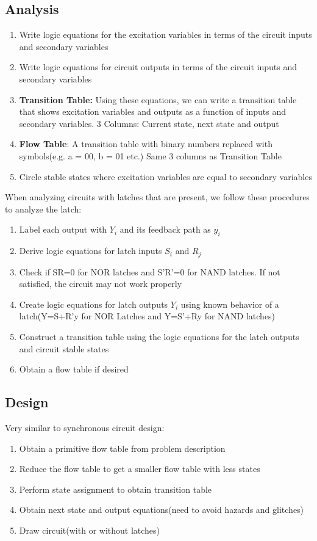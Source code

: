 \documentclass[12pt]{report}
\begin{document}
		\subsection{Analysis}
			\begin{enumerate}
				\item Write logic equations for the excitation variables in terms of the circuit inputs and secondary variables
				\item Write logic equations for circuit outputs in terms of the circuit inputs and secondary variables
				\item \textbf{Transition Table:} Using these equations, we can write a transition table that shows excitation variables and outputs as a function of inputs and secondary variables. 3 Columns: Current state, next state and output
				\item \textbf{Flow Table}: A transition table with binary numbers replaced with symbols(e.g. a = 00, b = 01 etc.) Same 3 columns as Transition Table
				\item Circle stable states where excitation variables are equal to secondary variables
			\end{enumerate}
			When analyzing circuits with latches that are present, we follow these procedures to analyze the latch:
			\begin{enumerate}
				\item Label each output with $Y_i$ and its feedback path as $y_i$
				\item Derive logic equations for latch inputs $S_i$ and $R_j$
				\item Check if SR=0 for NOR latches and S'R'=0 for NAND latches. If not satisfied, the circuit may not work properly
				\item Create logic equations for latch outputs $Y_i$ using known behavior of a latch(Y=S+R'y for NOR Latches and Y=S'+Ry for NAND latches)
				\item Construct a transition table using the logic equations for the latch outputs and circuit stable states
				\item Obtain a flow table if desired 
			\end{enumerate}
		\subsection{Design}
			Very similar to synchronous circuit design:\\
			\begin{enumerate}
				\item Obtain a primitive flow table from problem description
				\item Reduce the flow table to get a smaller flow table with less states
				\item Perform state assignment to obtain transition table
				\item Obtain next state and output equations(need to avoid hazards and glitches)
				\item Draw circuit(with or without latches)
			\end{enumerate}
			
\end{document}
